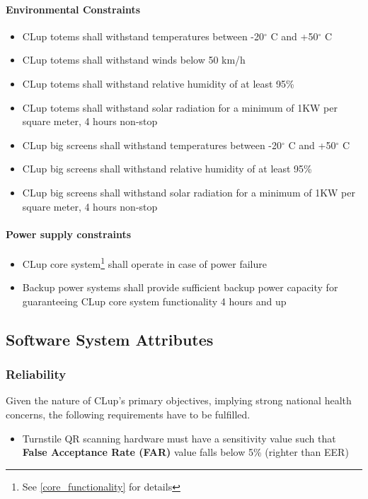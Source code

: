 \paragraph{Environmental Constraints}
\label{par:envConstraints}
\begin{itemize}[leftmargin=+.8in]
    \item[\ref{par:envConstraints}.1.1] CLup totems shall withstand temperatures between -20$^{\circ}$ C and +50$^{\circ}$ C
    \item[\ref{par:envConstraints}.1.2] CLup totems shall withstand winds below 50 km/h
    \item[\ref{par:envConstraints}.1.3] CLup totems shall withstand relative humidity of at least 95\% 
    \item[\ref{par:envConstraints}.1.4] CLup totems shall withstand solar radiation for a minimum of 1KW per square meter, 4 hours non-stop
    \item[\ref{par:envConstraints}.1.5] CLup big screens shall withstand temperatures between -20$^{\circ}$ C and +50$^{\circ}$ C
    \item[\ref{par:envConstraints}.1.6] CLup big screens shall withstand relative humidity of at least 95\%
    \item[\ref{par:envConstraints}.1.7] CLup big screens shall withstand solar radiation for a minimum of 1KW per square meter, 4 hours non-stop
\end{itemize}

\paragraph{Power supply constraints}
\label{par:powerSupply}

\begin{itemize}[leftmargin=+.8in]
    \item[\ref{par:powerSupply}.2.1] CLup core system\footnote{See \ref{core_functionality} for details} shall operate in case of power failure
    \item[\ref{par:powerSupply}.2.2] Backup power systems shall provide sufficient backup power capacity for guaranteeing CLup core system functionality 4 hours and up
\end{itemize}

\subsection{Software System Attributes}

\subsubsection{Reliability \label{subsub:reliability}}
Given the nature of CLup's primary objectives, implying strong national health concerns, the following requirements have to be fulfilled.\newline
\begin{itemize}[leftmargin=+.8in]
    \item[\ref{subsub:reliability}.1] Turnstile QR scanning hardware must have a sensitivity value such that \textbf{False Acceptance Rate (FAR)} value falls below 5\% (righter than EER)
\end{itemize}

